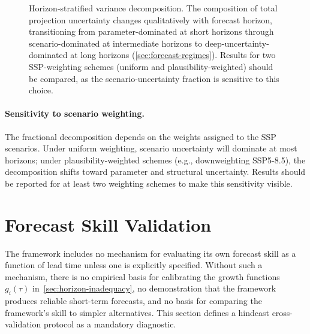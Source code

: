 \documentclass[11pt]{article}
\begin{document}
\begin{figure}[ht]
\centering
{}
\caption{Horizon-stratified variance decomposition.  The composition of total projection uncertainty changes qualitatively with forecast horizon, transitioning from parameter-dominated at short horizons through scenario-dominated at intermediate horizons to deep-uncertainty-dominated at long horizons (\cref{sec:forecast-regimes}).  Results for two SSP-weighting schemes (uniform and plausibility-weighted) should be compared, as the scenario-uncertainty fraction is sensitive to this choice.}
\label{fig:variance-horizon}
\end{figure}

\paragraph{Sensitivity to scenario weighting.}  The fractional decomposition depends on the weights assigned to the SSP scenarios.  Under uniform weighting, scenario uncertainty will dominate at most horizons; under plausibility-weighted schemes (e.g., downweighting SSP5-8.5), the decomposition shifts toward parameter and structural uncertainty.  Results should be reported for at least two weighting schemes to make this sensitivity visible.


\section{Forecast Skill Validation}
\label{sec:hindcast}

The framework includes no mechanism for evaluating its own forecast skill as a function of lead time unless one is explicitly specified.  Without such a mechanism, there is no empirical basis for calibrating the growth functions $g_i(\tau)$ in~\cref{sec:horizon-inadequacy}, no demonstration that the framework produces reliable short-term forecasts, and no basis for comparing the framework's skill to simpler alternatives.  This section defines a hindcast cross-validation protocol as a mandatory diagnostic.
\end{document}
